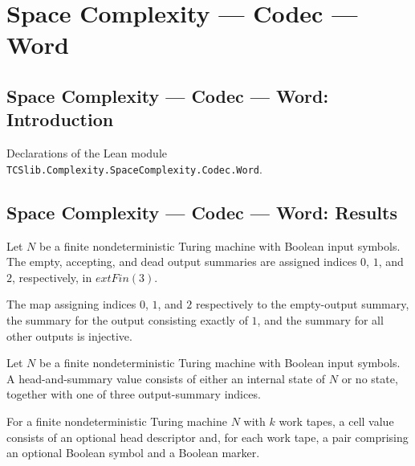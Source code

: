 \section{Space Complexity --- Codec --- Word}
\subsection*{Space Complexity --- Codec --- Word: Introduction}

Declarations of the Lean module \texttt{TCSlib.Complexity.SpaceComplexity.Codec.Word}.

\subsection*{Space Complexity --- Codec --- Word: Results}

\begin{definition}
\label{Complexity.Codec.sumIdx}
\leanok
{}
Let $N$ be a finite nondeterministic Turing machine with Boolean input symbols. The
empty, accepting, and dead output summaries are assigned indices $0$, $1$, and $2$,
respectively, in $	ext{Fin}(3)$.
\end{definition}

\begin{lemma}
\label{Complexity.Codec.sumIdx_injective}
\leanok
{}
The map assigning indices $0$, $1$, and $2$ respectively to the empty-output summary,
the summary for the output consisting exactly of $1$, and the summary for all other
outputs is injective.
\end{lemma}

\begin{definition}
\label{Complexity.Codec.Hd}
\leanok
Let $N$ be a finite nondeterministic Turing machine with Boolean input symbols. A
head-and-summary value consists of either an internal state of $N$ or no state, together
with one of three output-summary indices.
\end{definition}

\begin{definition}
\label{Complexity.Codec.CellV}
\leanok
{}
For a finite nondeterministic Turing machine $N$ with $k$ work tapes, a cell value
consists of an optional head descriptor and, for each work tape, a pair comprising an
optional Boolean symbol and a Boolean marker.
\end{definition}

